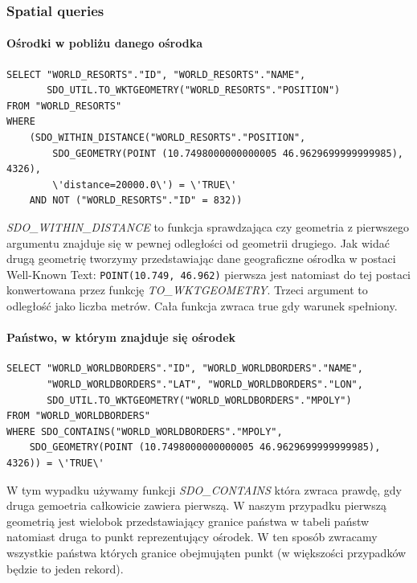 \documentclass[12pt]{article}
\begin{document}
\subsubsection{Spatial queries}
\paragraph{Ośrodki w pobliżu danego ośrodka}
\begin{verbatim}
SELECT "WORLD_RESORTS"."ID", "WORLD_RESORTS"."NAME",
       SDO_UTIL.TO_WKTGEOMETRY("WORLD_RESORTS"."POSITION")
FROM "WORLD_RESORTS"
WHERE
    (SDO_WITHIN_DISTANCE("WORLD_RESORTS"."POSITION",
        SDO_GEOMETRY(POINT (10.7498000000000005 46.9629699999999985), 4326),
        \'distance=20000.0\') = \'TRUE\'
    AND NOT ("WORLD_RESORTS"."ID" = 832))
\end{verbatim}
\emph{SDO\_WITHIN\_DISTANCE} to funkcja sprawdzająca czy geometria z pierwszego argumentu znajduje się w pewnej
odległości od geometrii drugiego. Jak widać drugą geometrię tworzymy przedstawiając dane geograficzne ośrodka
w postaci Well-Known Text: \texttt{POINT(10.749, 46.962)} pierwsza jest natomiast do tej postaci konwertowana
przez funkcję \emph{TO\_WKTGEOMETRY}. Trzeci argument to odległość jako liczba metrów. Cała
funkcja zwraca true gdy warunek spełniony.

\paragraph{Państwo, w którym znajduje się ośrodek}
\begin{verbatim}
SELECT "WORLD_WORLDBORDERS"."ID", "WORLD_WORLDBORDERS"."NAME",
       "WORLD_WORLDBORDERS"."LAT", "WORLD_WORLDBORDERS"."LON",
       SDO_UTIL.TO_WKTGEOMETRY("WORLD_WORLDBORDERS"."MPOLY")
FROM "WORLD_WORLDBORDERS"
WHERE SDO_CONTAINS("WORLD_WORLDBORDERS"."MPOLY",
    SDO_GEOMETRY(POINT (10.7498000000000005 46.9629699999999985), 4326)) = \'TRUE\'
\end{verbatim}
W tym wypadku używamy funkcji \emph{SDO\_CONTAINS} która zwraca prawdę, gdy druga gemoetria całkowicie zawiera pierwszą.
W naszym przypadku pierwszą geometrią jest wielobok przedstawiający granice państwa w tabeli państw natomiast druga to
punkt reprezentujący ośrodek. W ten sposób zwracamy wszystkie państwa których granice obejmująten punkt (w większości
przypadków będzie to jeden rekord).
\end{document}
